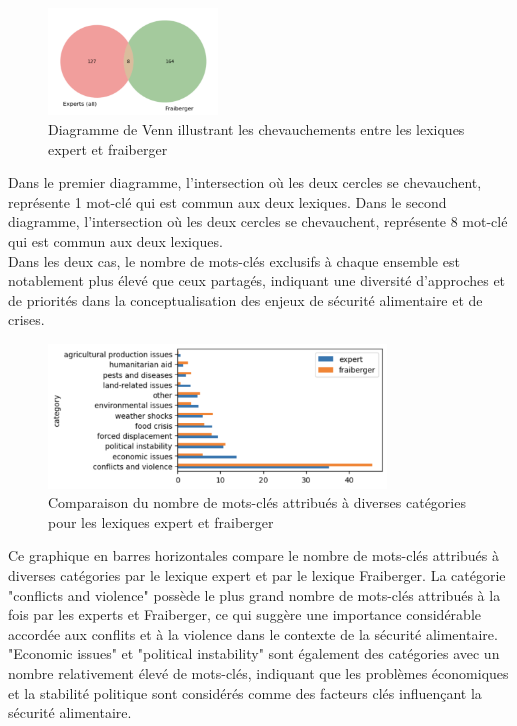\documentclass{article}
\begin{document}
\begin{figure}[h]
    \centering
    \includegraphics[width=0.4\textwidth]{expert_fraiberger.png}
    \caption{Diagramme de Venn illustrant les chevauchements entre les lexiques expert et fraiberger}
    \label{fig:expert_fraiberger}
\end{figure}
\vspace{2cm}
Dans le premier diagramme, l'intersection où les deux cercles se chevauchent, représente 1 mot-clé qui est commun aux deux lexiques. Dans le second diagramme, l'intersection où les deux cercles se chevauchent, représente 8 mot-clé qui est commun aux deux lexiques. \\

Dans les deux cas, le nombre de mots-clés exclusifs à chaque ensemble est notablement plus élevé que ceux partagés, indiquant une diversité d'approches et de priorités dans la conceptualisation des enjeux de sécurité alimentaire et de crises.
\vspace{0.5cm}

\begin{figure}[h]
    \centering
    \includegraphics[width=0.8\textwidth]{freq_cat.png}
    \caption{Comparaison du nombre de mots-clés attribués à diverses catégories pour les lexiques expert et fraiberger}
    \label{fig:freq_cat}
\end{figure}
\vspace{0.5cm}

Ce graphique en barres horizontales compare le nombre de mots-clés attribués à diverses catégories par le lexique expert et par le lexique Fraiberger. La catégorie "conflicts and violence" possède le plus grand nombre de mots-clés attribués à la fois par les experts et Fraiberger, ce qui suggère une importance considérable accordée aux conflits et à la violence dans le contexte de la sécurité alimentaire. "Economic issues" et "political instability" sont également des catégories avec un nombre relativement élevé de mots-clés, indiquant que les problèmes économiques et la stabilité politique sont considérés comme des facteurs clés influençant la sécurité alimentaire.
\end{document}
